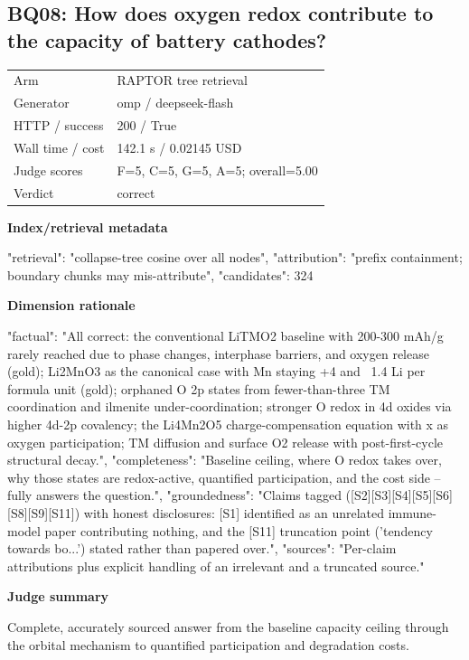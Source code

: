 \documentclass[10pt]{article}
\begin{document}
\subsection{BQ08: How does oxygen redox contribute to the capacity of battery cathodes?}
\begin{tabular}{@{}ll@{}}
Arm & RAPTOR tree retrieval\\
Generator & omp / deepseek-flash\\
HTTP / success & 200 / True\\
Wall time / cost & 142.1 s / 0.02145 USD\\
Judge scores & F=5, C=5, G=5, A=5; overall=5.00\\
Verdict & correct\\
\end{tabular}

\textbf{Index/retrieval metadata}
\begin{EvidenceText}
{
  "retrieval": "collapse-tree cosine over all nodes",
  "attribution": "prefix containment; boundary chunks may mis-attribute",
  "candidates": 324
}
\end{EvidenceText}

\textbf{Dimension rationale}
\begin{EvidenceText}
{
  "factual": "All correct: the conventional LiTMO2 baseline with 200-300 mAh/g rarely reached due to phase changes, interphase barriers, and oxygen release (gold); Li2MnO3 as the canonical case with Mn staying +4 and ~1.4 Li per formula unit (gold); orphaned O 2p states from fewer-than-three TM coordination and ilmenite under-coordination; stronger O redox in 4d oxides via higher 4d-2p covalency; the Li4Mn2O5 charge-compensation equation with x as oxygen participation; TM diffusion and surface O2 release with post-first-cycle structural decay.",
  "completeness": "Baseline ceiling, where O redox takes over, why those states are redox-active, quantified participation, and the cost side -- fully answers the question.",
  "groundedness": "Claims tagged ([S2][S3][S4][S5][S6][S8][S9][S11]) with honest disclosures: [S1] identified as an unrelated immune-model paper contributing nothing, and the [S11] truncation point ('tendency towards bo...') stated rather than papered over.",
  "sources": "Per-claim attributions plus explicit handling of an irrelevant and a truncated source."
}
\end{EvidenceText}

\textbf{Judge summary}
\begin{EvidenceText}
Complete, accurately sourced answer from the baseline capacity ceiling through the orbital mechanism to quantified participation and degradation costs.
\end{EvidenceText}
\end{document}
